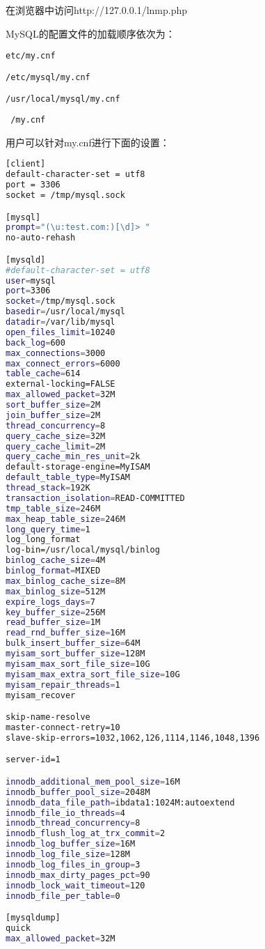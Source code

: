 在浏览器中访问http://127.0.0.1/lnmp.php



MySQL的配置文件的加载顺序依次为：

\begin{compactitem}
\item \texttt{etc/my.cnf}
\item \texttt{/etc/mysql/my.cnf}
\item \texttt{/usr/local/mysql/my.cnf}
\item \texttt{~/my.cnf}
\end{compactitem}

用户可以针对my.cnf进行下面的设置：


\begin{lstlisting}[language=bash]
[client]
default-character-set = utf8
port = 3306
socket = /tmp/mysql.sock

[mysql]
prompt="(\u:test.com:)[\d]> "
no-auto-rehash

[mysqld]
#default-character-set = utf8
user=mysql
port=3306
socket=/tmp/mysql.sock
basedir=/usr/local/mysql
datadir=/var/lib/mysql
open_files_limit=10240
back_log=600
max_connections=3000
max_connect_errors=6000
table_cache=614
external-locking=FALSE
max_allowed_packet=32M
sort_buffer_size=2M
join_buffer_size=2M
thread_concurrency=8
query_cache_size=32M
query_cache_limit=2M
query_cache_min_res_unit=2k
default-storage-engine=MyISAM
default_table_type=MyISAM
thread_stack=192K
transaction_isolation=READ-COMMITTED
tmp_table_size=246M
max_heap_table_size=246M
long_query_time=1
log_long_format
log-bin=/usr/local/mysql/binlog
binlog_cache_size=4M
binlog_format=MIXED
max_binlog_cache_size=8M
max_binlog_size=512M
expire_logs_days=7
key_buffer_size=256M
read_buffer_size=1M
read_rnd_buffer_size=16M
bulk_insert_buffer_size=64M
myisam_sort_buffer_size=128M
myisam_max_sort_file_size=10G
myisam_max_extra_sort_file_size=10G
myisam_repair_threads=1
myisam_recover

skip-name-resolve
master-connect-retry=10
slave-skip-errors=1032,1062,126,1114,1146,1048,1396

server-id=1

innodb_additional_mem_pool_size=16M
innodb_buffer_pool_size=2048M
innodb_data_file_path=ibdata1:1024M:autoextend
innodb_file_io_threads=4
innodb_thread_concurrency=8
innodb_flush_log_at_trx_commit=2
innodb_log_buffer_size=16M
innodb_log_file_size=128M
innodb_log_files_in_group=3
innodb_max_dirty_pages_pct=90
innodb_lock_wait_timeout=120
innodb_file_per_table=0

[mysqldump]
quick
max_allowed_packet=32M
\end{lstlisting}





